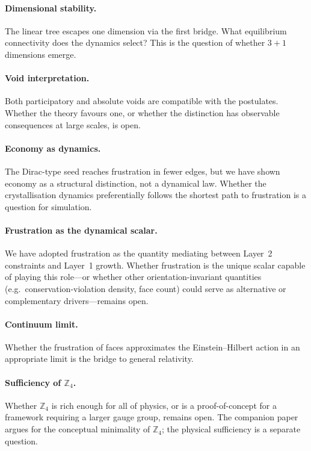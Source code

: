 \documentclass[11pt,a4paper]{article}
\theoremstyle{definition}
\theoremstyle{plain}
\theoremstyle{remark}
\newcommand{\Zf}{\mathbb{Z}_4}
\begin{document}
\paragraph{Dimensional stability.}
The linear tree escapes one dimension via the first bridge.  What equilibrium connectivity does the dynamics select?  This is the question of whether $3{+}1$ dimensions emerge.

\paragraph{Void interpretation.}
Both participatory and absolute voids are compatible with the postulates.  Whether the theory favours one, or whether the distinction has observable consequences at large scales, is open.

\paragraph{Economy as dynamics.}
The Dirac-type seed reaches frustration in fewer edges, but we have shown economy as a structural distinction, not a dynamical law.  Whether the crystallisation dynamics preferentially follows the shortest path to frustration is a question for simulation.

\paragraph{Frustration as the dynamical scalar.}
We have adopted frustration as the quantity mediating between Layer~2 constraints and Layer~1 growth.  Whether frustration is the unique scalar capable of playing this role---or whether other orientation-invariant quantities (e.g.\ conservation-violation density, face count) could serve as alternative or complementary drivers---remains open.

\paragraph{Continuum limit.}
Whether the frustration of faces approximates the Einstein--Hilbert action in an appropriate limit is the bridge to general relativity.

\paragraph{Sufficiency of $\Zf$.}
Whether $\Zf$ is rich enough for all of physics, or is a proof-of-concept for a framework requiring a larger gauge group, remains open.  The companion paper argues for the conceptual minimality of $\Zf$; the physical sufficiency is a separate question.
\end{document}
